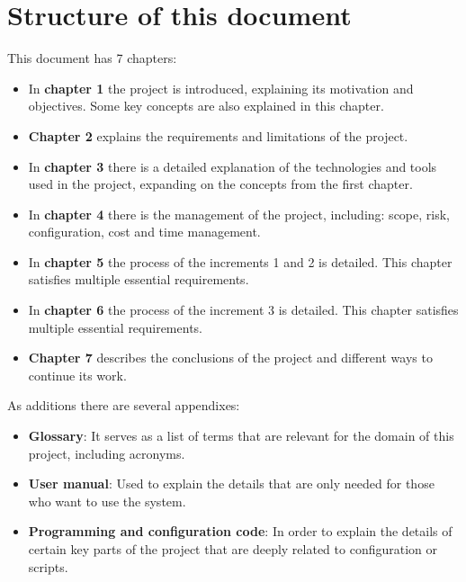 \section{Structure of this document}
This document has 7 chapters:
\begin{itemize}
	\item In \textbf{chapter 1} the project is introduced, explaining its motivation and objectives. Some key concepts are also explained in this chapter.
	\item \textbf{Chapter 2} explains the requirements and limitations of the project.
	\item In \textbf{chapter 3} there is a detailed explanation of the technologies and tools used in the project, expanding on the concepts from the first chapter.
	\item In \textbf{chapter 4} there is the management of the project, including: scope, risk, configuration, cost and time management.
	\item In \textbf{chapter 5} the process of the increments 1 and 2 is detailed. This chapter satisfies multiple essential requirements.
	\item In \textbf{chapter 6} the process of the increment 3 is detailed. This chapter satisfies multiple essential requirements.
	\item \textbf{Chapter 7} describes the conclusions of the project and different ways to continue its work.
\end{itemize}
\linej
As additions there are several appendixes:
\begin{itemize}
	\item \textbf{Glossary}: It serves as a list of terms that are relevant for the domain of this project, including acronyms.
	\item \textbf{User manual}: Used to explain the details that are only needed for those who want to use the system.
	\item \textbf{Programming and configuration code}: In order to explain the details of certain key parts of the project that are deeply related to configuration or scripts.
\end{itemize}
